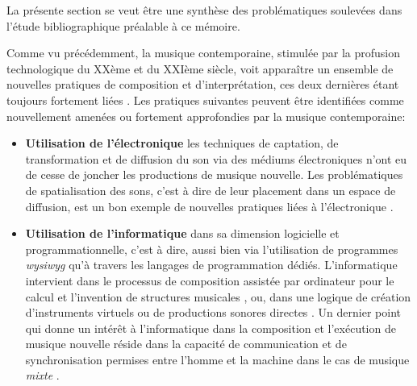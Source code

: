 La présente section se veut être une synthèse des problématiques soulevées dans l'étude bibliographique préalable à ce mémoire.

Comme vu précédemment, la musique contemporaine, stimulée par la profusion technologique du XXème et du XXIème siècle, voit apparaître un ensemble de nouvelles pratiques de composition et d'interprétation, ces deux dernières étant toujours fortement liées \cite{bosseur2005}.
Les pratiques suivantes peuvent être identifiées comme nouvellement amenées ou fortement approfondies par la musique contemporaine:

\begin{itemize}[label=--]
	\item \textbf{Utilisation de l'électronique} les techniques de captation, de transformation et de diffusion du son via des médiums électroniques n'ont eu de cesse de joncher les productions de musique nouvelle.
	Les problématiques de spatialisation des sons, c'est à dire de leur placement dans un espace de diffusion, est un bon exemple de nouvelles pratiques liées à l'électronique \cite{harley1993}.
	\item \textbf{Utilisation de l'informatique} dans sa dimension logicielle et programmationnelle, c'est à dire, aussi bien via l'utilisation de programmes \textit{wysiwyg} qu'à travers les langages de programmation dédiés. L'informatique intervient dans le processus de composition assistée par ordinateur pour le calcul et l'invention de structures musicales \cite{agon1998}, ou, dans une logique de création d'instruments virtuels ou de productions sonores directes \cite{puckette1991, mccartney1996}. Un dernier point qui donne un intérêt à l'informatique dans la composition et l'exécution de musique nouvelle réside dans la capacité de communication et de synchronisation permises entre l'homme et la machine dans le cas de musique \textit{mixte} \cite{cont2008}. 
\end{itemize}